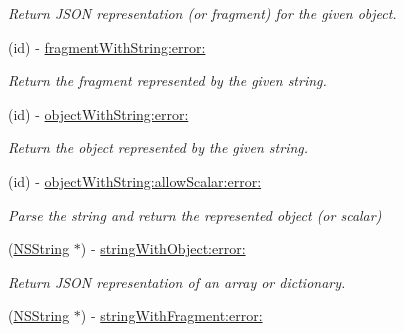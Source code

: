\begin{DoxyCompactItemize}
\begin{DoxyCompactList}\small\item\em \-Return \-J\-S\-O\-N representation (or fragment) for the given object. \end{DoxyCompactList}\item 
\hypertarget{interface_s_b_j_s_o_n_aa88f7cb9ddc4ab7fd6e9fc0853e6da6a}{
(id) -\/ \hyperlink{interface_s_b_j_s_o_n_aa88f7cb9ddc4ab7fd6e9fc0853e6da6a}{fragment\-With\-String\-:error\-:}}
\label{interface_s_b_j_s_o_n_aa88f7cb9ddc4ab7fd6e9fc0853e6da6a}

\begin{DoxyCompactList}\small\item\em \-Return the fragment represented by the given string. \end{DoxyCompactList}\item 
\hypertarget{interface_s_b_j_s_o_n_a2b0ae389a765270663c1e1110bcef613}{
(id) -\/ \hyperlink{interface_s_b_j_s_o_n_a2b0ae389a765270663c1e1110bcef613}{object\-With\-String\-:error\-:}}
\label{interface_s_b_j_s_o_n_a2b0ae389a765270663c1e1110bcef613}

\begin{DoxyCompactList}\small\item\em \-Return the object represented by the given string. \end{DoxyCompactList}\item 
\hypertarget{interface_s_b_j_s_o_n_a942831fa293980ad189b72860055d32a}{
(id) -\/ \hyperlink{interface_s_b_j_s_o_n_a942831fa293980ad189b72860055d32a}{object\-With\-String\-:allow\-Scalar\-:error\-:}}
\label{interface_s_b_j_s_o_n_a942831fa293980ad189b72860055d32a}

\begin{DoxyCompactList}\small\item\em \-Parse the string and return the represented object (or scalar) \end{DoxyCompactList}\item 
\hypertarget{interface_s_b_j_s_o_n_a3687db463abee044cb06e0924142deb8}{
(\hyperlink{class_n_s_string}{\-N\-S\-String} $\ast$) -\/ \hyperlink{interface_s_b_j_s_o_n_a3687db463abee044cb06e0924142deb8}{string\-With\-Object\-:error\-:}}
\label{interface_s_b_j_s_o_n_a3687db463abee044cb06e0924142deb8}

\begin{DoxyCompactList}\small\item\em \-Return \-J\-S\-O\-N representation of an array or dictionary. \end{DoxyCompactList}\item 
\hypertarget{interface_s_b_j_s_o_n_a006d605894edce824a18ec157ec28a3e}{
(\hyperlink{class_n_s_string}{\-N\-S\-String} $\ast$) -\/ \hyperlink{interface_s_b_j_s_o_n_a006d605894edce824a18ec157ec28a3e}{string\-With\-Fragment\-:error\-:}}
\label{interface_s_b_j_s_o_n_a006d605894edce824a18ec157ec28a3e}


\end{DoxyCompactItemize}
